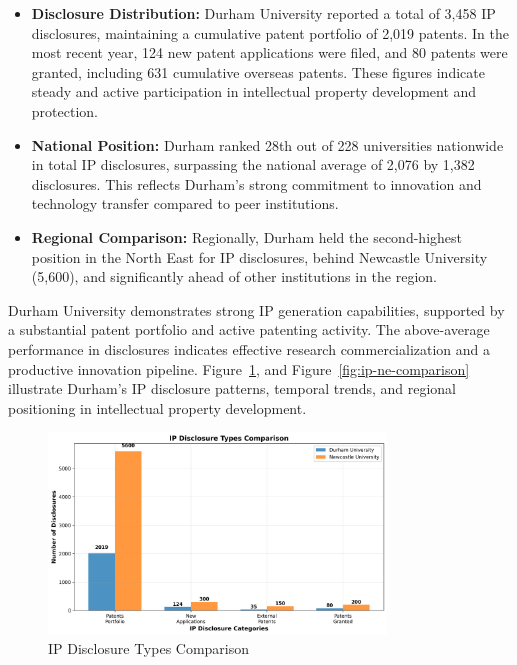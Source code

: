 \documentclass[journal,onecolumn, 10pt,draftclsnofoot]{IEEEtran}
\begin{document}
\begin{itemize}
    \item \textbf{Disclosure Distribution:} Durham University reported a total of 3,458 IP disclosures, maintaining a cumulative patent portfolio of 2,019 patents. In the most recent year, 124 new patent applications were filed, and 80 patents were granted, including 631 cumulative overseas patents. These figures indicate steady and active participation in intellectual property development and protection.
    
    \item \textbf{National Position:} Durham ranked 28th out of 228 universities nationwide in total IP disclosures, surpassing the national average of 2,076 by 1,382 disclosures. This reflects Durham's strong commitment to innovation and technology transfer compared to peer institutions.
    
    \item \textbf{Regional Comparison:} Regionally, Durham held the second-highest position in the North East for IP disclosures, behind Newcastle University (5,600), and significantly ahead of other institutions in the region.
\end{itemize}

Durham University demonstrates strong IP generation capabilities, supported by a substantial patent portfolio and active patenting activity. The above-average performance in disclosures indicates effective research commercialization and a productive innovation pipeline. Figure~\ref{fig:ip-disclosure-type}, and Figure~\ref{fig:ip-ne-comparison} illustrate Durham's IP disclosure patterns, temporal trends, and regional positioning in intellectual property development.



\begin{figure}[h]
\centering
\includegraphics[width=0.8\textwidth]{Fig/figure18.ip_disclosure_type.png}
\caption{IP Disclosure Types Comparison}
\label{fig:ip-disclosure-type}
\end{figure}
\end{document}
